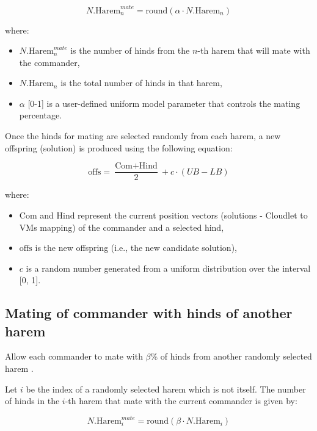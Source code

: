 \documentclass[pdflatex,sn-mathphys-num]{sn-jnl}%
\theoremstyle{thmstyleone}%
\theoremstyle{thmstyletwo}%
\theoremstyle{thmstylethree}%
\begin{document}
\begin{equation}
N.{\text{Harem}_n^{mate}} = \text{round}(\alpha \cdot N.{\text{Harem}_n})
\end{equation}

\noindent where:
\begin{itemize}
    \item $N.{\text{Harem}_n^{mate}}$ is the number of hinds from the $n$-th harem that will mate with the commander,
    \item $N.{\text{Harem}_n}$ is the total number of hinds in that harem,
    \item $\alpha$ [0-1] is a user-defined uniform model parameter that controls the mating percentage.
\end{itemize}

Once the hinds for mating are selected randomly from each harem, a new offspring (solution) is produced using the following equation:

\begin{equation}
\text{offs} = \frac{\text{Com} + \text{Hind}}{2} + c \cdot (UB - LB)
\end{equation}\label{offspring}

\noindent where:
\begin{itemize}
    \item $\text{Com}$ and $\text{Hind}$ represent the current position vectors (solutions - Cloudlet to VMs mapping) of the commander and a selected hind,
    \item $\text{offs}$ is the new offspring (i.e., the new candidate solution),
    \item $c$ is a random number generated from a uniform distribution over the interval [0, 1].
\end{itemize}


\subsection{Mating of commander with hinds of another harem}\label{subsec4.7}
Allow each commander to mate with $\beta$\% of hinds from another randomly selected harem \cite{red_deer}. 

Let $i$ be the index of a randomly selected harem which is not itself. The number of hinds in the $i$-th harem that mate with the current commander is given by:

\begin{equation}
N.{\text{Harem}_i^{mate}} = \text{round}( \beta \cdot N.{\text{Harem}_i} )
\end{equation}
\end{document}
